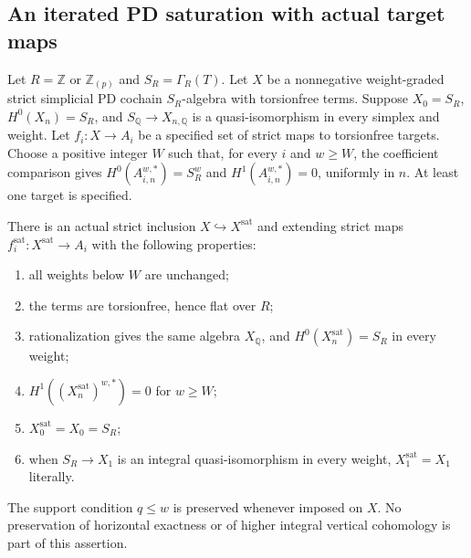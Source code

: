 \subsection{An iterated PD saturation with actual target maps}

\begin{theorem}
\label{ASAT01}
Let $R=\mathbb Z$ or $\mathbb Z_{(p)}$ and $S_R=\Gamma_R(T)$.
Let $X$ be a nonnegative weight-graded strict simplicial PD cochain
$S_R$-algebra with torsionfree terms. Suppose $X_0=S_R$,
$H^0(X_n)=S_R$, and $S_{\mathbb Q}\to X_{n,\mathbb Q}$ is a
quasi-isomorphism in every simplex and weight. Let
$f_i:X\to A_i$ be a specified set of strict maps to torsionfree
targets. Choose a positive integer $W$ such that, for every $i$
and $w\geq W$, the coefficient comparison gives
$H^0(A_{i,n}^{w,*})=S_R^w$ and $H^1(A_{i,n}^{w,*})=0$,
uniformly in $n$. At least one target is specified.

There is an actual strict inclusion $X\hookrightarrow X^{\mathrm{sat}}$
and extending strict maps $f_i^{\mathrm{sat}}:X^{\mathrm{sat}}\to A_i$
with the following properties:
\begin{enumerate}
\item all weights below $W$ are unchanged;
\item the terms are torsionfree, hence flat over $R$;
\item rationalization gives the same algebra $X_{\mathbb Q}$,
      and $H^0(X^{\mathrm{sat}}_n)=S_R$ in every weight;
\item $H^1((X^{\mathrm{sat}}_n)^{w,*})=0$ for $w\geq W$;
\item $X^{\mathrm{sat}}_0=X_0=S_R$;
\item when $S_R\to X_1$ is an integral quasi-isomorphism
      in every weight, $X^{\mathrm{sat}}_1=X_1$ literally.
\end{enumerate}
The support condition $q\leq w$ is preserved whenever imposed on $X$.
No preservation of horizontal exactness or of higher integral
vertical cohomology is part of this assertion.
\end{theorem}

